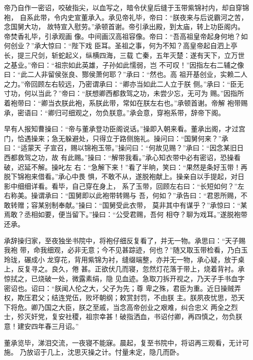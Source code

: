 帝乃自作一密诏，咬破指尖，以血写之，暗令伏皇后缝于玉带紫锦衬内，却自穿锦袍，
自系此带，令内史宣董承入。承见帝礼毕，帝曰：“朕夜来与后说霸河之苦，念国舅大功，
故特宣入慰劳。”承顿首谢。帝引承出殿，到太庙，转上功臣阁内。帝焚香礼毕，引承观画
像。中间画汉高祖容像。帝曰：“吾高祖皇帝起身何地？如何创业？”承大惊曰：“陛下戏
臣耳。圣祖之事，何为不知？高皇帝起自泗上亭长，提三尺剑，斩蛇起义，纵横四海，三载
亡秦，五年灭楚：遂有天下，立万世之基业。”帝曰：“祖宗如此英雄，子孙如此懦弱，岂
不可叹！”因指左右二辅之像曰：“此二人非留侯张良、酂侯萧何耶？”承曰：“然也。高
祖开基创业，实赖二人之力。”帝回顾左右较远，乃密谓承曰：“卿亦当如此二人立于朕
侧。”承曰：“臣无寸功，何以当此？”帝曰：“朕想卿西都救驾之功，未尝少忘，无可为
赐。”因指所着袍带曰：“卿当衣朕此袍，系朕此带，常如在朕左右也。”承顿首谢。帝解
袍带赐承，密语曰：“卿归可细观之，勿负朕意。”承会意，穿袍系带，辞帝下阁。

早有人报知曹操曰：“帝与董承登功臣阁说话。”操即入朝来看。董承出阁，才过宫
门，恰遇操来；急无躲避处，只得立于路侧施礼。操问曰：“国舅何来？”承曰：“适蒙天
子宣召，赐以锦袍玉带。”操问曰：“何故见赐？”承曰：“因念某旧日西都救驾之功，故
有此赐。”操曰：“解带我看。”承心知衣带中必有密诏，恐操看破，迟延不解。操叱左
右：“急解下来！”看了半晌，笑曰：“果然是条好玉带！再脱下锦袍来借看。”承心中畏
惧，不敢不从，遂脱袍献上。操亲自以手提起，对日影中细细详看。看毕，自己穿在身上，
系了玉带，回顾左右曰：“长短如何？”左右称美。操谓承曰：“国舅即以此袍带转赐与
吾，何如？”承告曰：“君恩所赐，不敢转赠；容某别制奉献。”操曰：“国舅受此衣带，
莫非其中有谋乎？”承惊曰：“某焉敢？丞相如要，便当留下。”操曰：“公受君赐，吾何
相夺？聊为戏耳。”遂脱袍带还承。

承辞操归家，至夜独坐书院中，将袍仔细反复看了，并无一物。承思曰：“天子赐我袍
带，命我细观，必非无意；今不见甚踪迹，何也？”随又取玉带检看，乃白玉玲珑，碾成小
龙穿花，背用紫锦为衬，缝缀端整，亦并无一物，承心疑，放于桌上，反复寻之。良久，倦
甚。正欲伏几而寝，忽然灯花落于带上，烧着背衬。承惊拭之，已烧破一处，微露素绢，隐
见血迹。急取刀拆开视之，乃天子手书血字密诏也。诏曰：“朕闻人伦之大，父子为先；尊
卑之殊，君臣为重。近日操贼弄权，欺压君父；结连党伍，败坏朝纲；敕赏封罚，不由朕
主。朕夙夜忧思，恐天下将危。卿乃国之大臣，朕之至戚，当念高帝创业之艰难，纠合忠义
两全之烈士，殄灭奸党，复安社稷，祖宗幸甚！破指洒血，书诏付卿，再四慎之，勿负朕
意！建安四年春三月诏。”

董承览毕，涕泪交流，一夜寝不能寐。晨起，复至书院中，将诏再三观看，无计可施。
乃放诏于几上，沈思灭操之计。忖量未定，隐几而卧。

